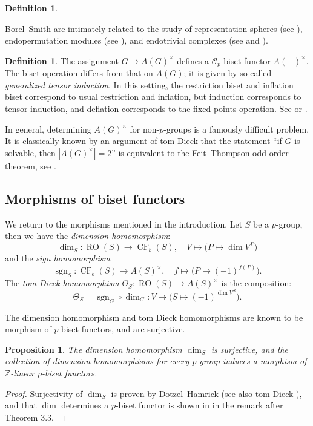 \documentclass[]{amsart}
\newcommand{\on}[1]{\operatorname{#1}}
\newcommand{\calC}{\mathcal{C}}
\newcommand{\bbZ}{\mathbb{Z}}
\newtheorem{proposition}[theorem]{Proposition}
\theoremstyle{remark}
\theoremstyle{definition}
\newtheorem{definition}[theorem]{Definition}
\begin{document}
\begin{definition}
\begin{enumerate}
			Borel--Smith are intimately related to the study of representation spheres (see \cite{DH81, tD87}), endopermutation modules (see \cite{Bou06}), and endotrivial complexes (see \cite{M24c, GM26} and ). 
		\end{enumerate}
	\end{definition}
	
	\begin{definition}
		The assignment $G \mapsto A(G)^\times$ defines a $\calC_p$-biset functor $A(-)^\times$. The biset operation differs from that on $A(G)$; it is given by so-called \emph{generalized tensor induction}. In this setting, the restriction biset and inflation biset correspond to usual restriction and inflation, but induction corresponds to tensor induction, and deflation corresponds to the fixed points operation. See \cite{Bou07} or \cite[Section 11.2]{Bou10}. 
		
		In general, determining $A(G)^\times$ for non-$p$-groups is a famously difficult problem. It is classically known by an argument of tom Dieck that the statement ``if $G$ is solvable, then $|A(G)^\times| = 2$'' is equivalent to the Feit--Thompson odd order theorem, see \cite[Theorem 11.2.4]{Bou10}.
	\end{definition}
	
	\subsection{Morphisms of biset functors}
	
	We return to the morphisms mentioned in the introduction. Let $S$ be a $p$-group, then we have the \emph{dimension homomorphism}: 
	\[\dim_S\colon \on{RO}(S) \to \on{CF}_b(S),\quad V \mapsto \big(P \mapsto \dim V^P\big)\] and the \emph{sign homomorphism} 
	\[\on{sgn}_S\colon \on{CF}_b(S)\to A(S)^\times,\quad f \mapsto \big(P \mapsto (-1)^{f(P)}\big).\]    
	The \emph{tom Dieck homomorphism} $\Theta_S\colon \on{RO}(S) \to A(S)^\times$ is the composition:
	\[\Theta_S = \on{sgn}_G\circ\dim_G\colon V \mapsto \big(S \mapsto (-1)^{\dim V^S}\big).\]
	
	The dimension homomorphism and tom Dieck homomorphisms are known to be morphism of $p$-biset functors, and are surjective. 
	
	\begin{proposition}
		The dimension homomorphism $\dim_S$ is surjective, and the collection of dimension homomorphisms for every $p$-group induces a morphism of $\bbZ$-linear $p$-biset functors. 
	\end{proposition}
	\begin{proof}
		Surjectivity of $\dim_S$ is proven by Dotzel--Hamrick \cite{DH81} (see also tom Dieck \cite{tD87}), and that $\dim$ determines a $p$-biset functor is shown in \cite{BoYa07} in the remark after Theorem 3.3.
		
	\end{proof}
	
\end{document}
